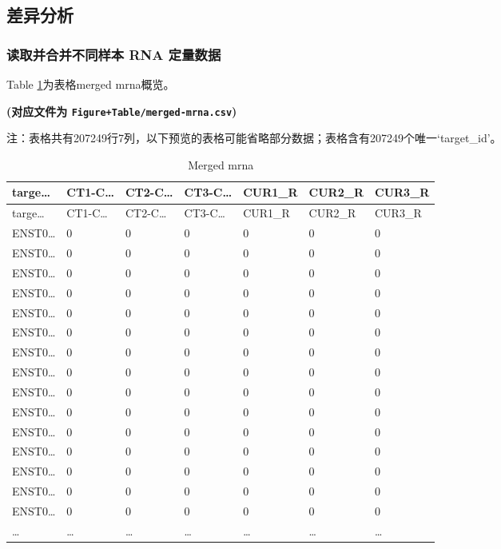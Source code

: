 \documentclass[
]{article}
\begin{document}
\hypertarget{ux5deeux5f02ux5206ux6790}{%
\subsection{差异分析}\label{ux5deeux5f02ux5206ux6790}}

\hypertarget{ux8bfbux53d6ux5e76ux5408ux5e76ux4e0dux540cux6837ux672c-rna-ux5b9aux91cfux6570ux636e}{%
\subsubsection{读取并合并不同样本 RNA 定量数据}\label{ux8bfbux53d6ux5e76ux5408ux5e76ux4e0dux540cux6837ux672c-rna-ux5b9aux91cfux6570ux636e}}

Table \ref{tab:merged-mrna}为表格merged mrna概览。

\textbf{(对应文件为 \texttt{Figure+Table/merged-mrna.csv})}

\begin{center}\begin{tcolorbox}[colback=gray!10, colframe=gray!50, width=0.9\linewidth, arc=1mm, boxrule=0.5pt]注：表格共有207249行7列，以下预览的表格可能省略部分数据；表格含有207249个唯一`target\_id'。
\end{tcolorbox}
\end{center}

\begin{longtable}[]{@{}lllllll@{}}
\caption{\label{tab:merged-mrna}Merged mrna}\tabularnewline
\toprule
targe\ldots{} & CT1-C\ldots{} & CT2-C\ldots{} & CT3-C\ldots{} & CUR1\_R & CUR2\_R & CUR3\_R\tabularnewline
\midrule
\endfirsthead
\toprule
targe\ldots{} & CT1-C\ldots{} & CT2-C\ldots{} & CT3-C\ldots{} & CUR1\_R & CUR2\_R & CUR3\_R\tabularnewline
\midrule
\endhead
ENST0\ldots{} & 0 & 0 & 0 & 0 & 0 & 0\tabularnewline
ENST0\ldots{} & 0 & 0 & 0 & 0 & 0 & 0\tabularnewline
ENST0\ldots{} & 0 & 0 & 0 & 0 & 0 & 0\tabularnewline
ENST0\ldots{} & 0 & 0 & 0 & 0 & 0 & 0\tabularnewline
ENST0\ldots{} & 0 & 0 & 0 & 0 & 0 & 0\tabularnewline
ENST0\ldots{} & 0 & 0 & 0 & 0 & 0 & 0\tabularnewline
ENST0\ldots{} & 0 & 0 & 0 & 0 & 0 & 0\tabularnewline
ENST0\ldots{} & 0 & 0 & 0 & 0 & 0 & 0\tabularnewline
ENST0\ldots{} & 0 & 0 & 0 & 0 & 0 & 0\tabularnewline
ENST0\ldots{} & 0 & 0 & 0 & 0 & 0 & 0\tabularnewline
ENST0\ldots{} & 0 & 0 & 0 & 0 & 0 & 0\tabularnewline
ENST0\ldots{} & 0 & 0 & 0 & 0 & 0 & 0\tabularnewline
ENST0\ldots{} & 0 & 0 & 0 & 0 & 0 & 0\tabularnewline
ENST0\ldots{} & 0 & 0 & 0 & 0 & 0 & 0\tabularnewline
ENST0\ldots{} & 0 & 0 & 0 & 0 & 0 & 0\tabularnewline
\ldots{} & \ldots{} & \ldots{} & \ldots{} & \ldots{} & \ldots{} & \ldots{}\tabularnewline
\bottomrule
\end{longtable}
\end{document}

